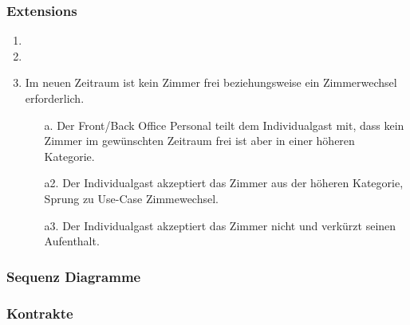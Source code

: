 \documentclass[./detailed_overview_usecases.tex]{subfiles}
\begin{document}
    \subsubsection*{Extensions}
    \begin{enumerate}
        \item 
		\item 
		\item Im neuen Zeitraum ist kein Zimmer frei beziehungsweise ein Zimmerwechsel erforderlich.
        \begin{itemize}
                       \item[a.] Der Front/Back Office Personal teilt dem Individualgast mit, dass kein Zimmer im gewünschten Zeitraum frei ist aber in einer höheren Kategorie.
					   \item[a2.] Der Individualgast akzeptiert das Zimmer aus der höheren Kategorie, Sprung zu Use-Case Zimmewechsel.
					   \item[a3.] Der Individualgast akzeptiert das Zimmer nicht und verkürzt seinen Aufenthalt.
                       
        \end{itemize}
    \end{enumerate}

    \subsubsection{Sequenz Diagramme}
    \subsubsection{Kontrakte}
\end{document}
